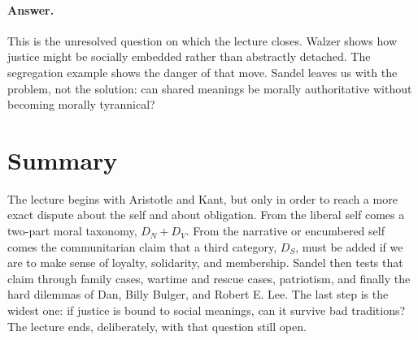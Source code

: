 \paragraph{Answer.} This is the unresolved question on which the lecture closes. Walzer shows how justice might be socially embedded rather than abstractly detached. The segregation example shows the danger of that move. Sandel leaves us with the problem, not the solution: can shared meanings be morally authoritative without becoming morally tyrannical?

\section{Summary}

The lecture begins with Aristotle and Kant, but only in order to reach a more exact dispute about the self and about obligation. From the liberal self comes a two-part moral taxonomy, \(D_N + D_V\). From the narrative or encumbered self comes the communitarian claim that a third category, \(D_S\), must be added if we are to make sense of loyalty, solidarity, and membership. Sandel then tests that claim through family cases, wartime and rescue cases, patriotism, and finally the hard dilemmas of Dan, Billy Bulger, and Robert E. Lee. The last step is the widest one: if justice is bound to social meanings, can it survive bad traditions? The lecture ends, deliberately, with that question still open.